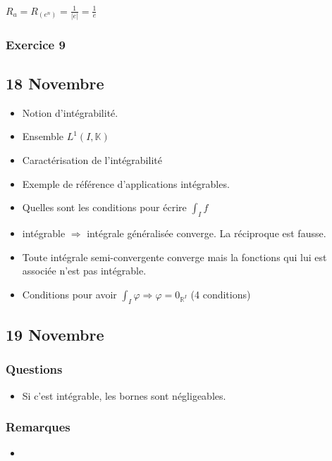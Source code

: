 \documentclass[a4paper, 11pt, hidelinks]{article}
\begin{document}
$R_a=R_{(e^n)}=\frac{1}{|e|}=\frac{1}{e}$



\subsubsection{Exercice 9}



\subsection{18 Novembre}

\begin{itemize}
    \item Notion d'intégrabilité.
    \item Ensemble $L^1(I,\mathbb{K})$
    \item Caractérisation de l'intégrabilité 
    \item Exemple de référence d'applications intégrables.
    \item Quelles sont les conditions pour écrire $\int_{I} f$
    \item intégrable $\Rightarrow$ intégrale généralisée converge. La réciproque est fausse.
    \item Toute intégrale semi-convergente converge mais la fonctions qui lui est associée n'est pas intégrable.
    \item Conditions pour avoir $\int_{I} \varphi \Rightarrow \varphi =0_{\mathbb{R}^I}$ (4 conditions)
\end{itemize}





\subsection{19 Novembre}


\subsubsection{Questions}


\begin{itemize}
    \item Si c'est intégrable, les bornes sont négligeables.
\end{itemize}


\subsubsection{Remarques}

\begin{itemize}
    \item 
\end{itemize}
\end{document}
